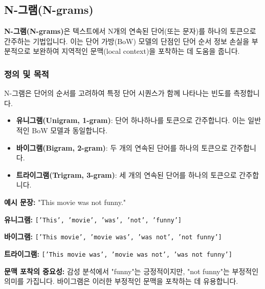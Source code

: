 \documentclass[11pt,a4paper]{article}
\theoremstyle{definition}
\begin{document}
\newpage
\subsection{N-그램(N-grams)}

\begin{tcolorbox}[conceptbox, title=\textbf{핵심 개념}]
\textbf{N-그램(N-grams)}은 텍스트에서 N개의 연속된 단어(또는 문자)를 하나의 토큰으로 간주하는 기법입니다. 이는 단어 가방(BoW) 모델의 단점인 단어 순서 정보 손실을 부분적으로 보완하여 지역적인 문맥(local context)을 포착하는 데 도움을 줍니다.
\end{tcolorbox}

\subsubsection{정의 및 목적}
N-그램은 단어의 순서를 고려하여 특정 단어 시퀀스가 함께 나타나는 빈도를 측정합니다.

\begin{itemize}
    \item \textbf{유니그램(Unigram, 1-gram)}: 단어 하나하나를 토큰으로 간주합니다. 이는 일반적인 BoW 모델과 동일합니다.
    \item \textbf{바이그램(Bigram, 2-gram)}: 두 개의 연속된 단어를 하나의 토큰으로 간주합니다.
    \item \textbf{트라이그램(Trigram, 3-gram)}: 세 개의 연속된 단어를 하나의 토큰으로 간주합니다.
\end{itemize}

\begin{tcolorbox}[examplebox, title=\textbf{예시}]
\textbf{예시 문장:} "This movie was not funny."

\textbf{유니그램:} \texttt{['This', 'movie', 'was', 'not', 'funny']}

\textbf{바이그램:} \texttt{['This movie', 'movie was', 'was not', 'not funny']}

\textbf{트라이그램:} \texttt{['This movie was', 'movie was not', 'was not funny']}

\textbf{문맥 포착의 중요성:} 감성 분석에서 "funny"는 긍정적이지만, "not funny"는 부정적인 의미를 가집니다. 바이그램은 이러한 부정적인 문맥을 포착하는 데 유용합니다.
\end{tcolorbox}
\end{document}
